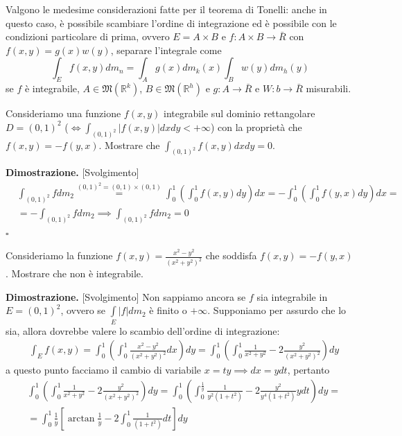 %
\begin{remark}
	Valgono le medesime considerazioni fatte per il teorema di Tonelli: anche in questo caso, è possibile scambiare l'ordine di integrazione
	ed è possibile con le condizioni particolare di prima, ovvero $E=A \times B$ e $f: A \times B \to \bar{R}$ con $f(x, y) = g(x)w(y)$, separare l'integrale come
	$$
	\int_E f(x, y)dm_n = \int_A g(x)dm_k(x) \int_B w(y)dm_h(y)
	$$
	se $f$ è integrabile, $A \in \mathfrak{M}(\mathbb{R}^k)$, $B \in \mathfrak{M}(\mathbb{R}^h)$ e $g: A \to \bar{R}$ e $W: b \to \bar{R}$ misurabili.
\end{remark}
%
\vspace{0.5cm}
\begin{example}
	Consideriamo una funzione $f(x, y)$ integrabile sul dominio rettangolare $D=(0,1)^2$ ($\iff \int_{(0,1)^2} |f(x, y)|dxdy < +\infty$) con la proprietà che $f(x,y)=-f(y,x)$. Mostrare che
	$\int_{(0,1)^2} f(x,y)dxdy = 0$.
\end{example}
%
\noindent \textbf{Dimostrazione. }[Svolgimento]
\[\begin{aligned}
&\int_{(0,1)^2} fdm_2 \stackrel{(0,1)^2 = (0,1) \times (0,1)}{=} \int_0^1 \left( \int_0^1 f(x, y) dy \right)dx = -\int_0^1 \left( \int_0^1 f(y,x) dy \right) dx = \\
&= - \int_{(0,1)^2} fdm_2 \implies \int_{(0,1)^2} fdm_2 = 0 
\end{aligned}\]
\hfill $\square$
%
%
\vspace{0.5cm}
\begin{example}
	Consideriamo la funzione $f(x, y)=\frac{x^2 - y^2}{(x^2 + y^2)^2}$ che soddisfa $f(x, y) = -f(y,x)$. Mostrare che non è integrabile.
\end{example}
%
\noindent \textbf{Dimostrazione. }[Svolgimento]
	Non sappiamo ancora se $f$ sia integrabile in $E = (0,1)^2$, ovvero se $\int\limits_E |f|dm_2$ è finito o $+\infty$. Supponiamo per assurdo che lo sia, allora dovrebbe valere lo scambio dell'ordine di integrazione:
	\[\begin{aligned}
	&\int_E f(x, y) = \int_0^1 \left( \int_0^1 \frac{x^2 - y^2}{(x^2 + y^2)^2} dx \right) dy = \int_0^1 \left( \int_0^1 \frac{1}{x^2+y^2} - 2\frac{y^2}{(x^2 + y^2)^2} \right) dy
	\end{aligned}\]
	a questo punto facciamo il cambio di variabile $x = ty \implies dx = ydt$, pertanto
	\[\begin{aligned}
	&\int_0^1 \left( \int_0^1 \frac{1}{x^2+y^2} - 2\frac{y^2}{(x^2 + y^2)^2} \right) dy = \int_0^1 \left( \int_0^{\frac{1}{y}} \frac{1}{y^2(1+t^2)} - 2\frac{y^2}{y^4(1+t^2)} ydt \right)dy = \\
	&=\int_0^1 \frac{1}{y} \left[ \arctan{\frac{1}{y}} - 2 \int_0^1 \frac{1}{(1+t^2)}dt \right]dy
	\end{aligned}\]

